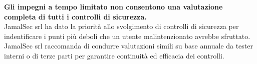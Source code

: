 \begin{cvletter}
   \textbf{Gli impegni a tempo limitato non consentono una valutazione completa di tutti i controlli di sicurezza.}\\
   JamalSec srl ha dato la priorità allo svolgimento di controlli di sicurezza per
   indentificare i punti più deboli che un utente malintenzionato avrebbe sfruttato.\\
   JamalSec srl raccomanda di condurre valutazioni simili su base annuale da
   tester interni o di terze parti per garantire continuità ed efficacia dei controlli.

\end{cvletter}

